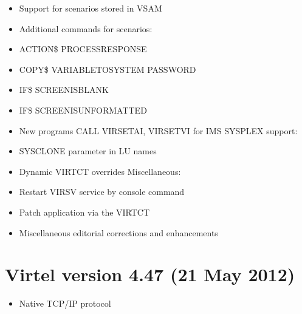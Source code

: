 \documentclass[letterpaper,10pt,english]{sphinxmanual}
\begin{document}
\sphinxAtStartPar
{}
\begin{itemize}
\item {} 
\sphinxAtStartPar
Support for scenarios stored in VSAM

\item {} 
\sphinxAtStartPar
Additional commands for scenarios:

\item {} 
\sphinxAtStartPar
ACTION\$ PROCESS\sphinxhyphen{}RESPONSE

\item {} 
\sphinxAtStartPar
COPY\$ VARIABLE\sphinxhyphen{}TO\sphinxhyphen{}SYSTEM PASSWORD

\item {} 
\sphinxAtStartPar
IF\$ SCREEN\sphinxhyphen{}IS\sphinxhyphen{}BLANK

\item {} 
\sphinxAtStartPar
IF\$ SCREEN\sphinxhyphen{}IS\sphinxhyphen{}UNFORMATTED

\end{itemize}

\sphinxAtStartPar
{}
\begin{itemize}
\item {} 
\sphinxAtStartPar
New programs CALL VIRSETAI, VIRSETVI for IMS SYSPLEX support:

\item {} 
\sphinxAtStartPar
SYSCLONE parameter in LU names

\item {} 
\sphinxAtStartPar
Dynamic VIRTCT overrides Miscellaneous:

\item {} 
\sphinxAtStartPar
Restart VIRSV service by console command

\item {} 
\sphinxAtStartPar
Patch application via the VIRTCT

\item {} 
\sphinxAtStartPar
Miscellaneous editorial corrections and enhancements

\end{itemize}


\section{Virtel version 4.47 (21 May 2012)}
\label{\detokenize{Installation_Guide:virtel-version-4-47-21-may-2012}}
\sphinxAtStartPar
{}
\begin{itemize}
\item {} 
\sphinxAtStartPar
Native TCP/IP protocol

\end{itemize}
\end{document}
